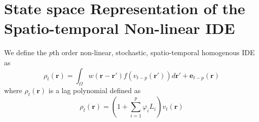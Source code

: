 \documentclass[11pt,draftcls,onecolumn,peerreview]{IEEEtran}
\begin{document}
%



\section{State space Representation of the Spatio-temporal Non-linear IDE}
We define the $p$th order non-linear, stochastic, spatio-temporal homogenous IDE as
 \begin{equation}\label{eq:IDEModel}
  \rho_t(\mathbf r)=\int_{\Omega}w(\mathbf r-\mathbf r')f(v_{t-p}(\mathbf r'))d\mathbf r'+\mathbf e_{t-p}(\mathbf r)
 \end{equation}
where $\rho_t(\mathbf r)$ is a lag polynomial defined as
\begin{equation}\label{eq:LagPolynomial}
 \rho_t(\mathbf r)=(1+\sum_{i=1}^{p}\varphi_i L_i)v_{t}\left(\mathbf r\right)
\end{equation}
\end{document}
